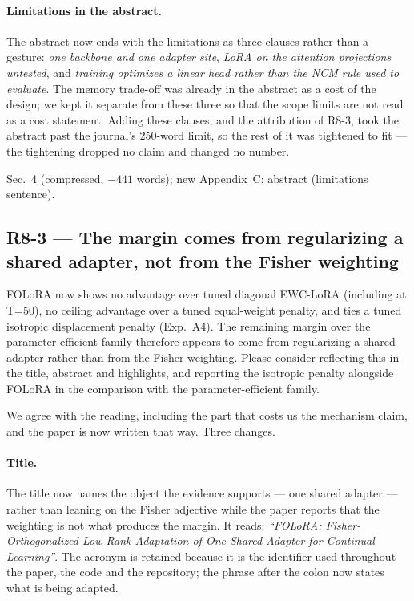 \paragraph{Limitations in the abstract.} The abstract now ends with the limitations as three
clauses rather than a gesture: \emph{one backbone and one adapter site}, \emph{LoRA on the
attention projections untested}, and \emph{training optimizes a linear head rather than the
NCM rule used to evaluate}. The memory trade-off was already in the abstract as a cost of the
design; we kept it separate from these three so that the scope limits are not read as a cost
statement. Adding these clauses, and the attribution of R8-3, took the abstract past the
journal's 250-word limit, so the rest of it was tightened to fit --- the tightening dropped no
claim and changed no number.

\change Sec.~4 (compressed, $-441$ words); new Appendix~C; abstract
(limitations sentence).

\subsection*{R8-3 --- The margin comes from regularizing a shared adapter, not from the Fisher weighting}

\begin{rquote}
FOLoRA now shows no advantage over tuned diagonal EWC-LoRA (including at T=50), no ceiling
advantage over a tuned equal-weight penalty, and ties a tuned isotropic displacement penalty
(Exp.~A4). The remaining margin over the parameter-efficient family therefore appears to come
from regularizing a shared adapter rather than from the Fisher weighting. Please consider
reflecting this in the title, abstract and highlights, and reporting the isotropic penalty
alongside FOLoRA in the comparison with the parameter-efficient family.
\end{rquote}

\resp We agree with the reading, including the part that costs us the mechanism claim, and the
paper is now written that way. Three changes.

\paragraph{Title.} The title now names the object the evidence supports --- one shared adapter
--- rather than leaning on the Fisher adjective while the paper reports that the weighting is
not what produces the margin. It reads: \emph{``FOLoRA: Fisher-Orthogonalized Low-Rank
Adaptation of One Shared Adapter for Continual Learning''}. The acronym is retained because it
is the identifier used throughout the paper, the code and the repository; the phrase after the
colon now states what is being adapted.

